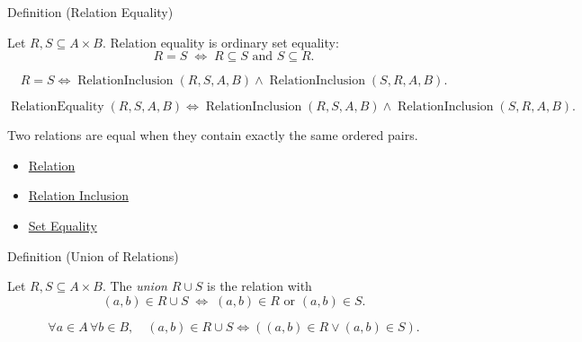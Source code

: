 \begin{definitionbox}{Definition (Relation Equality)}
\begin{definition}\label{def:relation-equality}
Let $R,S\subseteq A\times B$. Relation equality is ordinary set equality:
\[
R=S
\;\Longleftrightarrow\;
R\subseteq S \text{ and } S\subseteq R.
\]
\end{definition}
\end{definitionbox}

\begin{remark*}
\[
  R=S
  \iff
  \operatorname{RelationInclusion}(R,S,A,B)
  \wedge
  \operatorname{RelationInclusion}(S,R,A,B).
\]
\end{remark*}

\begin{remark*}
\[
  \operatorname{RelationEquality}(R,S,A,B)
  \iff
  \operatorname{RelationInclusion}(R,S,A,B)
  \wedge
  \operatorname{RelationInclusion}(S,R,A,B).
\]
\end{remark*}

\begin{remark*}[Interpretation]
Two relations are equal when they contain exactly the same ordered pairs.
\end{remark*}

\begin{dependencies}
\begin{itemize}
  \item \hyperref[def:relation]{Relation}
  \item \hyperref[def:relation-inclusion]{Relation Inclusion}
  \item \hyperref[def:set-equality]{Set Equality}
\end{itemize}
\end{dependencies}

\begin{definitionbox}{Definition (Union of Relations)}
\begin{definition}\label{def:relation-union}
Let $R,S\subseteq A\times B$. The \emph{union} $R\cup S$ is the relation with
\[
(a,b)\in R\cup S
\;\Longleftrightarrow\;
(a,b)\in R \text{ or } (a,b)\in S.
\]
\end{definition}
\end{definitionbox}

\begin{remark*}
\[
  \forall a\in A\,\forall b\in B,\quad
  (a,b)\in R\cup S
  \iff
  ((a,b)\in R\vee(a,b)\in S).
\]
\end{remark*}

